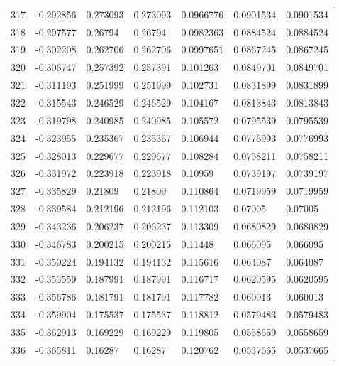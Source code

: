 \begin{longtable}{l|lll|lll}
 317 & -0.292856    & 0.273093    & 0.273093    &  0.0966776   & 0.0901534   & 0.0901534   \\
 318 & -0.297577    & 0.26794     & 0.26794     &  0.0982363   & 0.0884524   & 0.0884524   \\
 319 & -0.302208    & 0.262706    & 0.262706    &  0.0997651   & 0.0867245   & 0.0867245   \\
 320 & -0.306747    & 0.257392    & 0.257391    &  0.101263    & 0.0849701   & 0.0849701   \\
 321 & -0.311193    & 0.251999    & 0.251999    &  0.102731    & 0.0831899   & 0.0831899   \\
 322 & -0.315543    & 0.246529    & 0.246529    &  0.104167    & 0.0813843   & 0.0813843   \\
 323 & -0.319798    & 0.240985    & 0.240985    &  0.105572    & 0.0795539   & 0.0795539   \\
 324 & -0.323955    & 0.235367    & 0.235367    &  0.106944    & 0.0776993   & 0.0776993   \\
 325 & -0.328013    & 0.229677    & 0.229677    &  0.108284    & 0.0758211   & 0.0758211   \\
 326 & -0.331972    & 0.223918    & 0.223918    &  0.10959     & 0.0739197   & 0.0739197   \\
 327 & -0.335829    & 0.21809     & 0.21809     &  0.110864    & 0.0719959   & 0.0719959   \\
 328 & -0.339584    & 0.212196    & 0.212196    &  0.112103    & 0.07005     & 0.07005     \\
 329 & -0.343236    & 0.206237    & 0.206237    &  0.113309    & 0.0680829   & 0.0680829   \\
 330 & -0.346783    & 0.200215    & 0.200215    &  0.11448     & 0.066095    & 0.066095    \\
 331 & -0.350224    & 0.194132    & 0.194132    &  0.115616    & 0.064087    & 0.064087    \\
 332 & -0.353559    & 0.187991    & 0.187991    &  0.116717    & 0.0620595   & 0.0620595   \\
 333 & -0.356786    & 0.181791    & 0.181791    &  0.117782    & 0.060013    & 0.060013    \\
 334 & -0.359904    & 0.175537    & 0.175537    &  0.118812    & 0.0579483   & 0.0579483   \\
 335 & -0.362913    & 0.169229    & 0.169229    &  0.119805    & 0.0558659   & 0.0558659   \\
 336 & -0.365811    & 0.16287     & 0.16287     &  0.120762    & 0.0537665   & 0.0537665   \\

\end{longtable}
